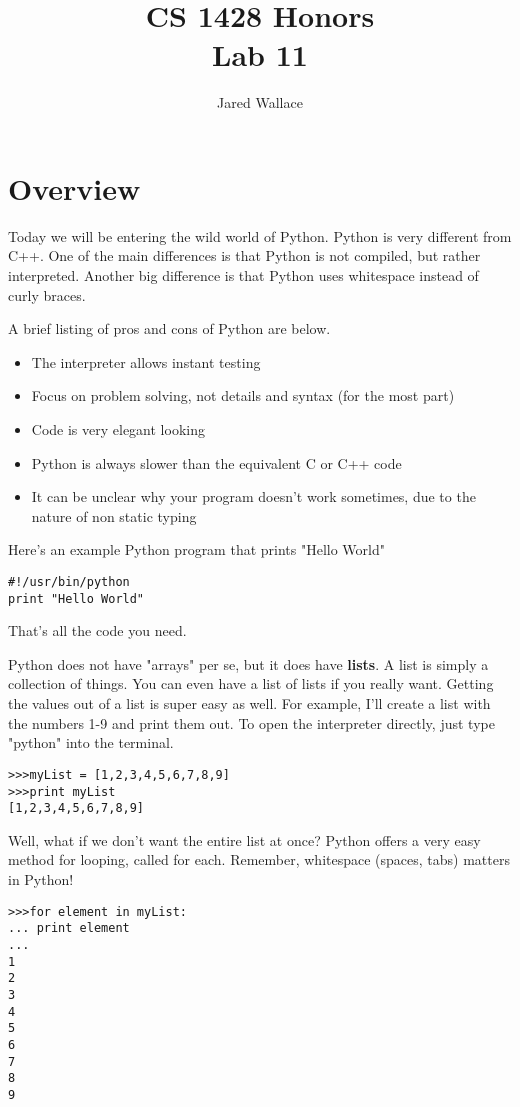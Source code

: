 \documentclass[letterpaper,12pt]{article}
\title{\Large CS 1428 Honors\\Lab 11}
\author{Jared Wallace}
\date{}
\begin{document}
\maketitle

\vspace{30mm}

\section*{Overview}
Today we will be entering the wild world of Python. Python is very different from
C++. One of the main differences is that Python is not compiled, but rather interpreted. Another
big difference is that Python uses whitespace instead of curly braces.

A brief listing of pros and cons of Python are below.
\begin{itemize}
    \item The interpreter allows instant testing
    \item Focus on problem solving, not details and syntax (for the most part)
    \item Code is very elegant looking
    \item Python is always slower than the equivalent C or C++ code
    \item It can be unclear why your program doesn't work sometimes, due to the nature of non static typing
\end{itemize}

Here's an example Python program that prints "Hello World"
\begin{lstlisting}
#!/usr/bin/python
print "Hello World"
\end{lstlisting}
That's all the code you need.

Python does not have "arrays" per se, but it does have \textbf{lists}. A list is simply a collection of things.
You can even have a list of lists if you really want. Getting the values out of a list is super easy as well.
For example, I'll create a list with the numbers 1-9 and print them out. To open the interpreter directly, just type
"python" into the terminal.
\begin{lstlisting}
>>>myList = [1,2,3,4,5,6,7,8,9]
>>>print myList
[1,2,3,4,5,6,7,8,9]
\end{lstlisting}

Well, what if we don't want the entire list at once? Python offers a very easy method for looping, called
for each. Remember, whitespace (spaces, tabs) matters in Python!
\begin{lstlisting}
>>>for element in myList:
... print element
...
1
2
3
4
5
6
7
8
9
\end{lstlisting}
\end{document}

